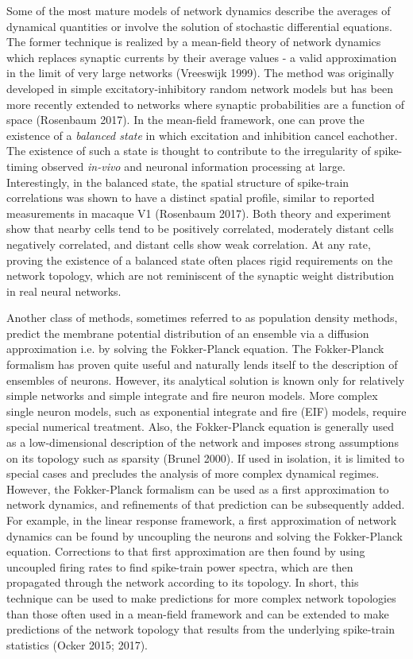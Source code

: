 \documentclass{ucetd}
\begin{document}
Some of the most mature models of network dynamics describe the averages of dynamical quantities or involve the solution of stochastic differential equations. The former technique is realized by a mean-field theory of network dynamics which replaces synaptic currents by their average values - a valid approximation in the limit of very large networks (Vreeswijk 1999). The method was originally developed in simple excitatory-inhibitory random network models but has been more recently extended to networks where synaptic probabilities are a function of space (Rosenbaum 2017). In the mean-field framework, one can prove the existence of a \emph{balanced state} in which excitation and inhibition cancel eachother. The existence of such a state is thought to contribute to the irregularity of spike-timing observed \emph{in-vivo} and neuronal information processing at large. Interestingly, in the balanced state, the spatial structure of spike-train correlations was shown to have a distinct spatial profile, similar to reported measurements in macaque V1 (Rosenbaum 2017). Both theory and experiment show that nearby cells tend to be positively correlated, moderately distant cells negatively correlated, and distant cells show weak correlation. At any rate, proving the existence of a balanced state often places rigid requirements on the network topology, which are not reminiscent of the synaptic weight distribution in real neural networks. 

Another class of methods, sometimes referred to as population density methods, predict the membrane potential distribution of an ensemble via a diffusion approximation i.e. by solving the Fokker-Planck equation. The Fokker-Planck formalism has proven quite useful and naturally lends itself to the description of ensembles of neurons. However, its analytical solution is known only for relatively simple networks and simple integrate and fire neuron models. More complex single neuron models, such as exponential integrate and fire (EIF) models, require special numerical treatment. Also, the Fokker-Planck equation is generally used as a low-dimensional description of the network and imposes strong assumptions on its topology such as sparsity (Brunel 2000). If used in isolation, it is limited to special cases and precludes the analysis of more complex dynamical regimes. However, the Fokker-Planck formalism can be used as a first approximation to network dynamics, and refinements of that prediction can be subsequently added. For example, in the linear response framework, a first approximation of network dynamics can be found by uncoupling the neurons and solving the Fokker-Planck equation. Corrections to that first approximation are then found by using uncoupled firing rates to find spike-train power spectra, which are then propagated through the network according to its topology. In short, this technique can be used to make predictions for more complex network topologies than those often used in a mean-field framework and can be extended to make predictions of the network topology that results from the underlying spike-train statistics (Ocker 2015; 2017). 
\end{document}
